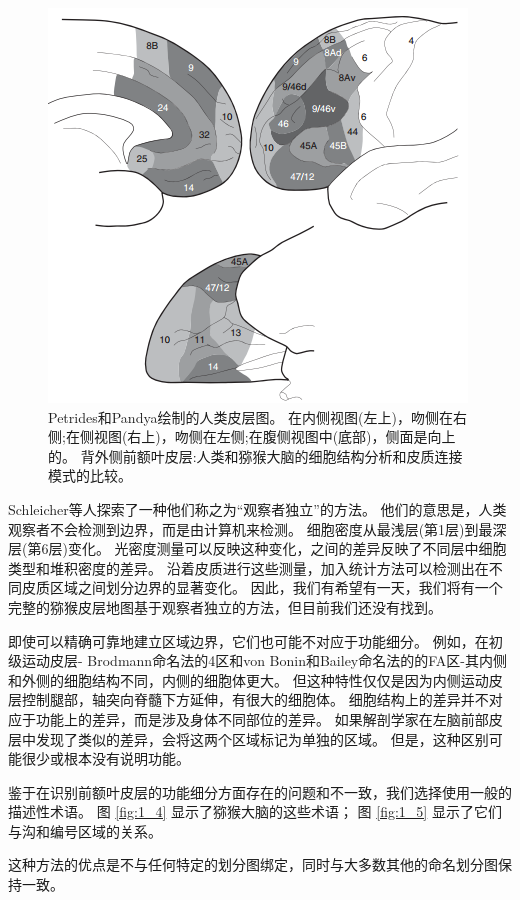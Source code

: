 \begin{figure}[!htb]
	\centering
	\includegraphics[width=0.5\linewidth]{image_pfc/Fig_1_3}
	\caption{Petrides和Pandya绘制的人类皮层图\cite{petrides1999dorsolateral}。
		在内侧视图(左上)，吻侧在右侧;在侧视图(右上)，吻侧在左侧;在腹侧视图中(底部)，侧面是向上的。
		背外侧前额叶皮层:人类和猕猴大脑的细胞结构分析和皮质连接模式的比较。\label{fig:1_3}}
\end{figure}


\par
Schleicher等人探索了一种他们称之为“观察者独立”的方法\cite{schleicher1999observer}。
他们的意思是，人类观察者不会检测到边界，而是由计算机来检测。
细胞密度从最浅层(第1层)到最深层(第6层)变化。
光密度测量可以反映这种变化，之间的差异反映了不同层中细胞类型和堆积密度的差异。
沿着皮质进行这些测量，加入统计方法可以检测出在不同皮质区域之间划分边界的显著变化。
因此，我们有希望有一天，我们将有一个完整的猕猴皮层地图基于观察者独立的方法，但目前我们还没有找到。

\par
即使可以精确可靠地建立区域边界，它们也可能不对应于功能细分。
例如，在初级运动皮层- Brodmann命名法的4区和von Bonin和Bailey命名法的的FA区-其内侧和外侧的细胞结构不同，内侧的细胞体更大。
但这种特性仅仅是因为内侧运动皮层控制腿部，轴突向脊髓下方延伸，有很大的细胞体。
细胞结构上的差异并不对应于功能上的差异，而是涉及身体不同部位的差异。
如果解剖学家在左脑前部皮层中发现了类似的差异，会将这两个区域标记为单独的区域。
但是，这种区别可能很少或根本没有说明功能。

\par
鉴于在识别前额叶皮层的功能细分方面存在的问题和不一致，我们选择使用一般的描述性术语。
图 \ref{fig:1_4} 显示了猕猴大脑的这些术语；
图 \ref{fig:1_5} 显示了它们与沟和编号区域的关系。

这种方法的优点是不与任何特定的划分图绑定，同时与大多数其他的命名划分图保持一致。

